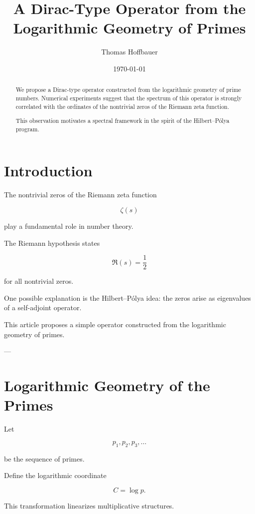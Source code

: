 \documentclass[11pt,a4paper]{article}
\title{
	A Dirac-Type Operator from the Logarithmic Geometry of Primes
}
\author{
	Thomas Hoffbauer
}
\date{\today}
\begin{document}
	
	\maketitle
	
	\begin{abstract}
		
		We propose a Dirac-type operator constructed from the logarithmic geometry of prime numbers.
		Numerical experiments suggest that the spectrum of this operator
		is strongly correlated with the ordinates of the nontrivial zeros
		of the Riemann zeta function.
		
		This observation motivates a spectral framework in the spirit of the
		Hilbert--Pólya program.
		
	\end{abstract}
	
	\tableofcontents
	
	\section{Introduction}
	
	The nontrivial zeros of the Riemann zeta function
	
	\[
	\zeta(s)
	\]
	
	play a fundamental role in number theory.
	
	The Riemann hypothesis states
	
	\[
	\Re(s)=\frac12
	\]
	
	for all nontrivial zeros.
	
	One possible explanation is the Hilbert--Pólya idea:
	the zeros arise as eigenvalues of a self-adjoint operator.
	
	This article proposes a simple operator constructed from
	the logarithmic geometry of primes.
	
	---
	
	\section{Logarithmic Geometry of the Primes}
	
	Let
	
	\[
	p_1,p_2,p_3,\dots
	\]
	
	be the sequence of primes.
	
	Define the logarithmic coordinate
	
	\[
	C=\log p.
	\]
	
	This transformation linearizes multiplicative structures.
	
\end{document}
